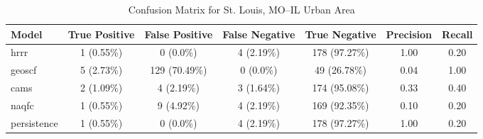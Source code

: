 \begin{table}[h!]
\centering
\begin{tabular}{lcccccc}
\hline
Model & True Positive & False Positive & False Negative & True Negative & Precision & Recall\\ \hline
hrrr & 1 (0.55\%) & 0 (0.0\%) & 4 (2.19\%) & 178 (97.27\%) & \cellcolor{green!25}1.00 & \cellcolor{green!25}0.20 \\ 
geoscf & 5 (2.73\%) & 129 (70.49\%) & 0 (0.0\%) & 49 (26.78\%) & \cellcolor{red!25}0.04 & \cellcolor{green!25}1.00 \\ 
cams & 2 (1.09\%) & 4 (2.19\%) & 3 (1.64\%) & 174 (95.08\%) & \cellcolor{red!25}0.33 & \cellcolor{green!25}0.40 \\ 
naqfc & 1 (0.55\%) & 9 (4.92\%) & 4 (2.19\%) & 169 (92.35\%) & \cellcolor{red!25}0.10 & \cellcolor{green!25}0.20 \\ 
persistence & 1 (0.55\%) & 0 (0.0\%) & 4 (2.19\%) & 178 (97.27\%) & 1.00 & 0.20 \\ 
\hline
\end{tabular}
\caption{Confusion Matrix for St. Louis, MO--IL Urban Area}
\end{table}
